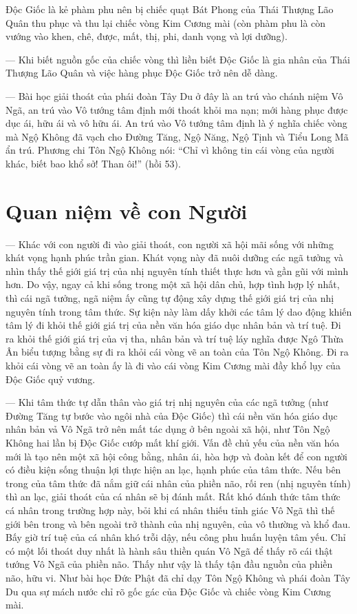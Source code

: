 Độc Giốc là kẻ phàm phu nên bị chiếc quạt Bát Phong của Thái Thượng Lão Quân thu phục và thu lại chiếc vòng Kim Cương mài (còn phàm phu là còn vướng vào khen, chê, được, mất, thị, phi, danh vọng và lợi dưỡng).

— Khi biết nguồn gốc của chiếc vòng thì liền biết Độc Giốc là gia nhân của Thái Thượng Lão Quân và việc hàng phục Độc Giốc trở nên dễ dàng.

— Bài học giải thoát của phái đoàn Tây Du ở đây là an trú vào chánh niệm Vô Ngã, an trú vào Vô tướng tâm định mới thoát khỏi ma nạn; mới hàng phục được dục ái, hữu ái và vô hữu ái. An trú vào Vô tướng tâm định là ý nghĩa chiếc vòng mà Ngộ Không đã vạch cho Đường Tăng, Ngộ Năng, Ngộ Tịnh và Tiểu Long Mã ẩn trú. Phương chi Tôn Ngộ Không nói: ``Chỉ vì không tin cái vòng của người khác, biết bao khổ sở! Than ôi!'' (hồi 53).

\section{Quan niệm về con Người} %
\label{sec:50_51_con_nguoi}

— Khác với con người đi vào giải thoát, con người xã hội mãi sống với những khát vọng hạnh phúc trần gian. Khát vọng này đã nuôi dưỡng các ngã tưởng và nhìn thấy thế giới giá trị của nhị nguyên tính thiết thực hơn và gần gũi với mình hơn. Do vậy, ngay cả khi sống trong một xã hội dân chủ, hợp tình hợp lý nhất, thì cái ngã tưởng, ngã niệm ấy cũng tự động xây dựng thế giới giá trị của nhị nguyên tính trong tâm thức. Sự kiện này làm dấy khởi các tâm lý dao động khiến tâm lý đi khỏi thế giới giá trị của nền văn hóa giáo dục nhân bản và trí tuệ. Đi ra khỏi thế giới giá trị của vị tha, nhân bản và trí tuệ láy nghĩa được Ngô Thừa Ân biểu tượng bằng sự đi ra khỏi cái vòng vẽ an toàn của Tôn Ngộ Không. Đi ra khỏi cái vòng vẽ an toàn ấy là đi vào cái vòng Kim Cương mài đầy khổ lụy của Độc Giốc quỷ vương.

— Khi tâm thức tự dẫn thân vào giá trị nhị nguyên của các ngã tưởng (như Đường Tăng tự bước vào ngôi nhà của Độc Giốc) thì cái nền văn hóa giáo dục nhân bản vả Vô Ngã trở nên mất tác dụng ở bên ngoài xã hội, như Tôn Ngộ Không hai lần bị Độc Giốc cướp mất khí giới. Vấn đề chủ yếu của nền văn hóa mới là tạo nên một xã hội công bằng, nhân ái, hòa hợp và đoàn kết để con người có điều kiện sống thuận lợi thực hiện an lạc, hạnh phúc của tâm thức. Nếu bên trong của tâm thức đã nắm giữ cái nhân của phiền não, rối ren (nhị nguyên tính) thì an lạc, giải thoát của cá nhân sẽ bị đánh mất. Rất khó đánh thức tâm thức cá nhân trong trường hợp này, bỏi khi cá nhân thiếu tỉnh giác Vô Ngã thì thế giới bên trong và bên ngoài trở thành của nhị nguyên, của vô thường và khổ đau. Bấy giờ trí tuệ của cá nhân khó trỗi dậy, nếu công phu huấn luyện tâm yếu. Chỉ có một lối thoát duy nhất là hành sâu thiền quán Vô Ngã để thấy rõ cái thật tướng Vô Ngã của phiền não. Thấy như vậy là thấy tận đầu nguồn của phiền não, hữu vi. Như bài học Đức Phật đã chỉ dạy Tôn Ngộ Không và phái đoàn Tây Du qua sự mách nước chỉ rõ gốc gác của Độc Giốc và chiếc vòng Kim Cương mài.

